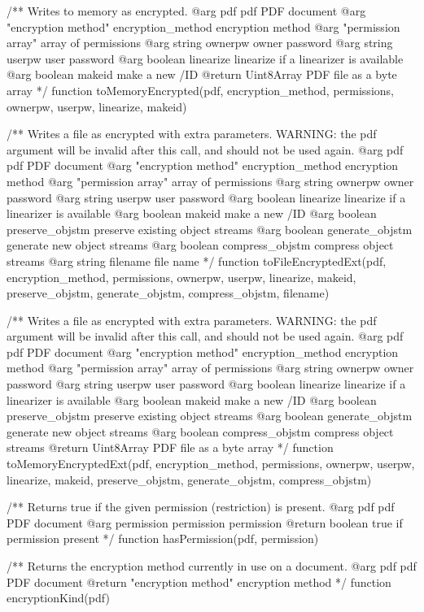 /** Writes to memory as encrypted.
@arg {pdf} pdf PDF document
@arg {"encryption method"} encryption_method encryption method
@arg {"permission array"} array of permissions
@arg {string} ownerpw owner password
@arg {string} userpw user password
@arg {boolean} linearize linearize if a linearizer is available
@arg {boolean} makeid make a new /ID
@return {Uint8Array} PDF file as a byte array */
function toMemoryEncrypted(pdf, encryption_method, permissions, ownerpw, userpw, linearize, makeid) {}

/** Writes a file as encrypted with extra parameters. WARNING: the pdf argument
will be invalid after this call, and should not be used again.
@arg {pdf} pdf PDF document
@arg {"encryption method"} encryption_method encryption method
@arg {"permission array"} array of permissions
@arg {string} ownerpw owner password
@arg {string} userpw user password
@arg {boolean} linearize linearize if a linearizer is available
@arg {boolean} makeid make a new /ID
@arg {boolean} preserve_objstm preserve existing object streams
@arg {boolean} generate_objstm generate new object streams
@arg {boolean} compress_objstm compress object streams
@arg {string} filename file name */
function toFileEncryptedExt(pdf, encryption_method, permissions, ownerpw, userpw, linearize, makeid, preserve_objstm, generate_objstm, compress_objstm, filename) {}

/** Writes a file as encrypted with extra parameters. WARNING: the pdf argument
will be invalid after this call, and should not be used again.
@arg {pdf} pdf PDF document
@arg {"encryption method"} encryption_method encryption method
@arg {"permission array"} array of permissions
@arg {string} ownerpw owner password
@arg {string} userpw user password
@arg {boolean} linearize linearize if a linearizer is available
@arg {boolean} makeid make a new /ID
@arg {boolean} preserve_objstm preserve existing object streams
@arg {boolean} generate_objstm generate new object streams
@arg {boolean} compress_objstm compress object streams
@return {Uint8Array} PDF file as a byte array */
function toMemoryEncryptedExt(pdf, encryption_method, permissions, ownerpw, userpw, linearize, makeid, preserve_objstm, generate_objstm, compress_objstm) {}

/** Returns true if the given permission (restriction) is present.
@arg {pdf} pdf PDF document
@arg {permission} permission permission
@return {boolean} true if permission present */
function hasPermission(pdf, permission) {}

/** Returns the encryption method currently in use on a document.
@arg {pdf} pdf PDF document
@return {"encryption method"} encryption method */
function encryptionKind(pdf) {}

